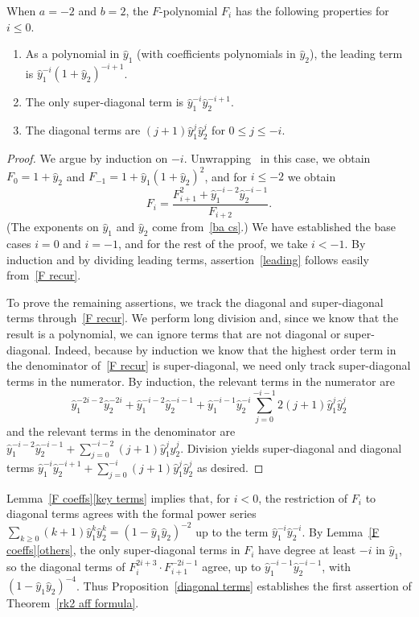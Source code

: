 \documentclass[ALCO,ThmDefs,Unicode,epreuves]{cedram}
\newcommand{\hy}{\hat{y}}
\begin{document}
\begin{lemma}\label{F coeffs}
When $a=-2$ and $b=2$, the $F$-polynomial $F_i$ has the following properties for $i\le 0$.
\begin{enumerate}[label=(\roman*)]%
\item \label{leading}
As a polynomial in $\hy_1$ (with coefficients polynomials in $\hy_2$), the leading term is $\hy_1^{-i}(1+\hy_2)^{-i+1}$.
\item \label{others}
The only super-diagonal term is $\hy_1^{-i}\hy_2^{-i+1}$.
\item \label{key terms}
The diagonal terms are $(j+1)\hy_1^j\hy_2^j$ for $0\le j\le-i$.
\end{enumerate}
\end{lemma}
\begin{proof}
We argue by induction on $-i$.
Unwrapping~\cite[Proposition~5.1]{ca4} in this case, we obtain $F_0=1+\hy_2$ and $F_{-1}=1+\hy_1(1+\hy_2)^2$, and for $i\le-2$ we obtain
\begin{equation}\label{F recur}
F_i=\frac{F_{i+1}^2+\hy_1^{-i-2}\hy_2^{-i-1}}{F_{i+2}}.
\end{equation}
(The exponents on $\hy_1$ and $\hy_2$ come from~\eqref{ba cs}.)
We have established the base cases $i=0$ and $i=-1$, and for the rest of the proof, we take $i<-1$.
By induction and by dividing leading terms, assertion~\ref{leading} follows easily from~\eqref{F recur}.

To prove the remaining assertions, we track the diagonal and super-diagonal terms through~\eqref{F recur}.
We perform long division and, since we know that the result is a polynomial, we can ignore terms that are not diagonal or super-diagonal.
Indeed, because by induction we know that the highest order term in the denominator of~\eqref{F recur} is super-diagonal, we need only track super-diagonal terms in the numerator.
By induction, the relevant terms in the numerator are 
\[\hy_1^{-2i-2}\hy_2^{-2i}+\hy_1^{-i-2}\hy_2^{-i-1}+\hy_1^{-i-1}\hy_2^{-i}\sum_{j=0}^{-i-1}2(j+1)\hy_1^j\hy_2^j\]
and the relevant terms in the denominator are $\hy_1^{-i-2}\hy_2^{-i-1}+\sum_{j=0}^{-i-2}(j+1)\hy_1^j\hy_2^j$.
Division yields super-diagonal and diagonal terms $\hy_1^{-i}\hy_2^{-i+1}+\sum_{j=0}^{-i}(j+1)\hy_1^j\hy_2^j$ as desired.
\end{proof}

Lemma~\ref{F coeffs}\ref{key terms} implies that, for $i<0$, the restriction of $F_i$ to diagonal terms agrees with the formal power series $\sum_{k\ge0}(k+1)\hy_1^k\hy_2^k=(1-\hy_1\hy_2)^{-2}$ up to the term $\hy_1^{-i}\hy_2^{-i}$.
By Lemma~\ref{F coeffs}\ref{others}, the only super-diagonal terms in $F_i$ have degree at least $-i$ in $\hy_1$, so the diagonal terms of $F_{i}^{2i+3}\cdot F_{i+1}^{-2i-1}$ agree, up to $\hy_1^{-i-1}\hy_2^{-i-1}$, with $(1-\hy_1\hy_2)^{-4}$.
Thus Proposition~\ref{diagonal terms} establishes the first assertion of Theorem~\ref{rk2 aff formula}.
\end{document}
